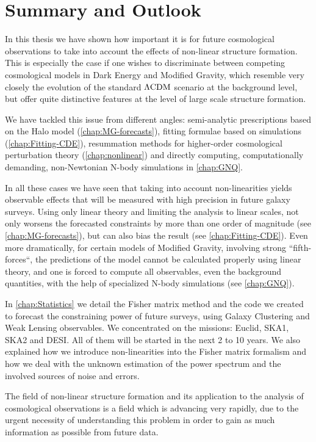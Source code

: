 \section*{Summary and Outlook}

In this thesis we have shown how important it is for future cosmological observations to take into account
the effects of non-linear structure formation. This is especially the case if one wishes to discriminate
between competing cosmological models in Dark Energy and Modified Gravity, which resemble 
very closely the evolution of the standard $\Lambda\mathrm{CDM}$ scenario at the background level,
but offer quite distinctive features at the level of large scale structure formation.

We have tackled this issue from different angles: 
semi-analytic prescriptions based on the Halo model (\cref{chap:MG-forecasts}), 
fitting formulae based on simulations (\cref{chap:Fitting-CDE}), 
resummation methods for higher-order cosmological perturbation theory (\cref{chap:nonlinear}) and directly computing,
computationally demanding, non-Newtonian N-body simulations in \cref{chap:GNQ}.

In all these cases we have seen that taking into account non-linearities yields observable effects that will
be measured with high precision in future galaxy surveys. Using only linear theory and limiting the 
analysis to linear scales, not only worsens the forecasted constraints by more than one order of magnitude (see 
\cref{chap:MG-forecasts}), but can also bias the result (see \cref{chap:Fitting-CDE}).
Even more dramatically, for certain models of Modified Gravity, involving strong ``fifth-forces``, 
the predictions of the model cannot be calculated properly using linear theory, and one is forced to compute
all observables, even the background quantities, with the help of specialized N-body simulations (see \cref{chap:GNQ}).

In \cref{chap:Statistics} we detail the Fisher matrix method and the code we created to forecast the
constraining power of future surveys, using Galaxy Clustering and Weak Lensing observables. We concentrated on the missions: 
Euclid, SKA1, SKA2 and DESI. All of them will be started in the next 2 to 10 years.
We also explained how we introduce non-linearities into the Fisher matrix formalism and how we deal with the unknown 
estimation of the power spectrum and the involved sources of noise and errors.

The field of non-linear structure formation and its application to the analysis of cosmological observations
is a field which is advancing very rapidly, due to the urgent necessity of understanding this problem in order
to gain as much information as possible from future data.

